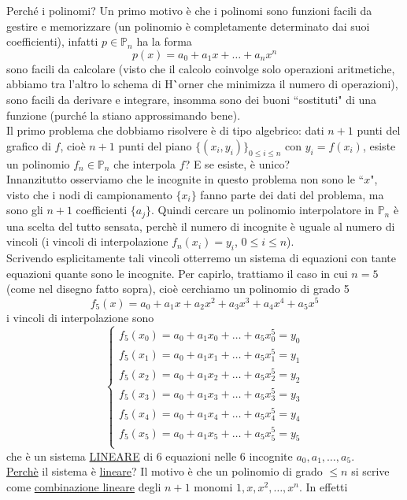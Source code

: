 \documentclass[12pt,headings=optiontohead]{article}
\begin{document}
Perché i polinomi? Un primo motivo è che i polinomi sono funzioni facili da gestire e memorizzare (un polinomio è completamente determinato dai suoi coefficienti), infatti $p \in \mathbb{P}_n$ ha la forma 
\[ p(x) = a_0 + a_1x + \dotso + a_n x^n \]
sono facili da calcolare (visto che il calcolo coinvolge solo operazioni aritmetiche, abbiamo tra l'altro lo schema di H{\``o}rner che minimizza il numero di operazioni), sono facili da derivare e integrare, insomma sono dei buoni ``sostituti" di una funzione (purché la stiano approssimando bene). \\
Il primo problema che dobbiamo risolvere è di tipo algebrico: dati $n+1$ punti del grafico di $f$, cioè $n+1$ punti del piano $\{(x_i,y_i)\}_{0\leq i\leq n}$ con $y_i=f(x_i)$, esiste un polinomio $f_n\in\mathbb{P}_n$ che interpola $f$? E se esiste, è unico?\\ Innanzitutto osserviamo che le incognite in questo problema non sono le ``$x$", visto che i nodi di campionamento $\{x_i\}$ fanno parte dei dati del problema, ma sono gli $n+1$ coefficienti $\{a_j\}$. Quindi cercare un polinomio interpolatore in $\mathbb{P}_n$ è una scelta del tutto sensata, perchè il numero di incognite è uguale al numero di vincoli (i vincoli di interpolazione $f_n(x_i)=y_i$, $0\leq i\leq n$).\\Scrivendo esplicitamente tali vincoli otterremo un sistema di equazioni con tante equazioni quante sono le incognite. Per capirlo, trattiamo il caso in cui $n=5$ (come nel disegno fatto sopra), cioè cerchiamo un polinomio di grado 5
\[ f_5(x)=a_0+a_1x+a_2x^2+a_3x^3+a_4x^4+a_5x^5 \]
i vincoli di interpolazione sono 
\[ \begin{cases}
    f_5(x_0)=a_0+a_1x_0+\dotso+a_5x_0^5=y_0\\
    f_5(x_1)=a_0+a_1x_1+\dotso+a_5x_1^5=y_1\\
    f_5(x_2)=a_0+a_1x_2+\dotso+a_5x_2^5=y_2\\
    f_5(x_3)=a_0+a_1x_3+\dotso+a_5x_3^5=y_3\\
    f_5(x_4)=a_0+a_1x_4+\dotso+a_5x_4^5=y_4\\
    f_5(x_5)=a_0+a_1x_5+\dotso+a_5x_5^5=y_5\\
\end{cases} \]
che è un sistema \uline{LINEARE} di 6 equazioni nelle 6 incognite $a_0,a_1,\dotso,a_5$.\\ 
\uline{Perchè} il sistema è \uline{lineare}? Il motivo è che un polinomio di grado $\leq n$ si scrive come \uline{combinazione lineare} degli $n+1$ monomi $1, x, x^2, \dotso, x^n$. In effetti
\end{document}
